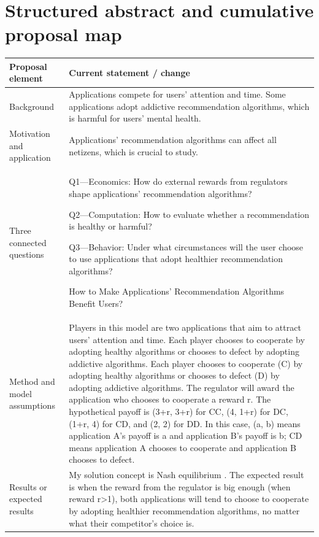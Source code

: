 \clearpage\onecolumn
\section{Structured abstract and cumulative proposal map}\label{app:abstract}
\par\medskip
\begin{table}[H]
\renewcommand{\arraystretch}{1.18}
\begin{tabularx}{\textwidth}{@{}p{}Y@{}}
\toprule
\textbf{Proposal element} & \textbf{Current statement / change}\\
\midrule
Background & Applications compete for users’ attention and time. Some applications adopt addictive recommendation algorithms, which is harmful for users’ mental health.\\
Motivation and application & Applications’ recommendation algorithms can affect all netizens, which is crucial to study.\\
Three connected questions & Q1—Economics: How do external rewards from regulators shape applications’ recommendation algorithms?\par Q2—Computation: How to evaluate whether a recommendation is healthy or harmful?\par Q3—Behavior: Under what circumstances will the user choose to use applications that adopt healthier recommendation algorithms?\par How to Make Applications’ Recommendation Algorithms Benefit Users?\\
Method and model assumptions & Players in this model are two applications that aim to attract users’ attention and time. Each player chooses to cooperate by adopting healthy algorithms or chooses to defect by adopting addictive algorithms. Each player chooses to cooperate (C) by adopting healthy algorithms or chooses to defect (D) by adopting addictive algorithms. The regulator will award the application who chooses to cooperate a reward r. The hypothetical payoff is (3+r, 3+r) for CC, (4, 1+r) for DC, (1+r, 4) for CD, and (2, 2) for DD. In this case, (a, b) means application A’s payoff is a and application B’s payoff is b; CD means application A chooses to cooperate and application B chooses to defect.\\
Results or expected results & My solution concept is Nash equilibrium \cite{nash1950}. The expected result is when the reward from the regulator is big enough (when reward r>1), both applications will tend to choose to cooperate by adopting healthier recommendation algorithms, no matter what their competitor’s choice is.\\

\end{tabularx}
\end{table}
